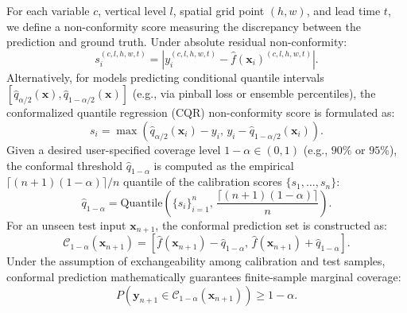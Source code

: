 For each variable $c$, vertical level $l$, spatial grid point $(h, w)$, and lead time $t$, we define a non-conformity score measuring the discrepancy between the prediction and ground truth. Under absolute residual non-conformity:
\begin{equation}
    s_i^{(c, l, h, w, t)} = \left| y_i^{(c, l, h, w, t)} - \hat{f}(\mathbf{x}_i)^{(c, l, h, w, t)} \right|.
    \label{eq:conformal_score}
\end{equation}
Alternatively, for models predicting conditional quantile intervals $[\hat{q}_{\alpha/2}(\mathbf{x}), \hat{q}_{1-\alpha/2}(\mathbf{x})]$ (e.g., via pinball loss or ensemble percentiles), the conformalized quantile regression (CQR) non-conformity score is formulated as:
\begin{equation}
    s_i = \max\left( \hat{q}_{\alpha/2}(\mathbf{x}_i) - y_i, \, y_i - \hat{q}_{1-\alpha/2}(\mathbf{x}_i) \right).
    \label{eq:cqr_score}
\end{equation}
Given a desired user-specified coverage level $1 - \alpha \in (0, 1)$ (e.g., $90\%$ or $95\%$), the conformal threshold $\hat{q}_{1-\alpha}$ is computed as the empirical $\lceil (n+1)(1-\alpha) \rceil / n$ quantile of the calibration scores $\{s_1, \dots, s_n\}$:
\begin{equation}
    \hat{q}_{1-\alpha} = \text{Quantile}\left( \{s_i\}_{i=1}^n, \, \frac{\lceil (n+1)(1-\alpha) \rceil}{n} \right).
\end{equation}
For an unseen test input $\mathbf{x}_{n+1}$, the conformal prediction set is constructed as:
\begin{equation}
    \mathcal{C}_{1-\alpha}(\mathbf{x}_{n+1}) = \left[ \hat{f}(\mathbf{x}_{n+1}) - \hat{q}_{1-\alpha}, \, \hat{f}(\mathbf{x}_{n+1}) + \hat{q}_{1-\alpha} \right].
    \label{eq:conformal_interval}
\end{equation}
Under the assumption of exchangeability among calibration and test samples, conformal prediction mathematically guarantees finite-sample marginal coverage:
\begin{equation}
    P\left( \mathbf{y}_{n+1} \in \mathcal{C}_{1-\alpha}(\mathbf{x}_{n+1}) \right) \ge 1 - \alpha.
    \label{eq:conformal_guarantee}
\end{equation}

